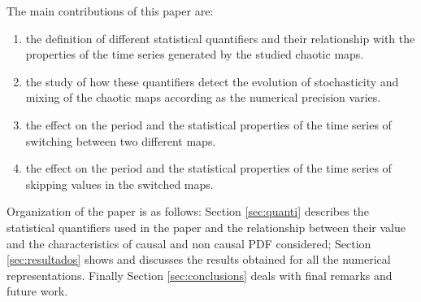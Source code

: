 The main contributions of this paper are:
\begin{enumerate}
\item the definition of different statistical quantifiers and their relationship with the properties of the time series generated by the studied chaotic maps.
\item the study of how these quantifiers detect the evolution of stochasticity and mixing of the chaotic maps according as the numerical precision varies.
\item the effect on the period and the statistical properties of the time series of switching between two different maps.
\item the effect on the period and the statistical properties of the time series of skipping values in the switched maps.
\end{enumerate}

Organization of the paper is as follows:
Section \ref{sec:quanti} describes the statistical quantifiers used in the paper and the relationship between their value and the characteristics of causal and non causal PDF considered;
Section \ref{sec:resultados} shows and discusses the results obtained for all the numerical representations.
Finally Section \ref{sec:conclusions} deals with final remarks and future work.